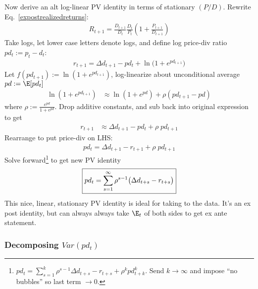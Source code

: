 \documentclass[12pt]{article}
\theoremstyle{plain}
\theoremstyle{definition}
\theoremstyle{remark}
\newcommand{\ra}{\rightarrow}
\begin{document}
\begin{multicols*}{2}
Now derive an alt log-linear PV identity in terms of
stationary $(P/D)$. Rewrite Eq.~\ref{expostrealizedreturns}:
\begin{align*}
  R_{t+1}
  =
  \frac{D_{t+1}}{D_t}
  \frac{D_{t}}{P_t}
  \left(
  1+
  \frac{P_{t+1}}{D_{t+1}}
  \right)
\end{align*}
Take logs, let lower case letters denote logs, and define log price-div
ratio $pd_t:=p_t-d_t$:
\begin{align*}
  r_{t+1}
  =
  \Delta d_{t+1} - pd_t + \ln\big( 1+ e^{pd_{t+1}} \big)
\end{align*}
Let $f(pd_{t+1}):=\ln(1+e^{pd_{t+1}})$, log-linearize
about unconditional average $pd:=\E[pd_t]$
\begin{align*}
  \ln(1+e^{pd_{t+1}})
  &\approx
  \ln(1+e^{pd})
  +
  \rho
  (pd_{t+1}-pd)
\end{align*}
where $\rho:=\frac{e^{pd}}{1+e^{pd}}$.
Drop additive constants, and sub back into original expression to get
\begin{align*}
  r_{t+1}
  &\approx \Delta d_{t+1} - pd_t + \rho \; pd_{t+1}
\end{align*}
Rearrange to put price-div on LHS:
\begin{align}
  pd_t
  =
    \Delta d_{t+1}- r_{t+1} + \rho \; pd_{t+1}
  \label{pdidentity}
\end{align}
Solve forward\footnote{%
  $pd_t = \sum_{s=1}^k \rho^{s-1}\Delta d_{t+s}-r_{t+s}+\rho^kpd_{t+k}^k$.
  Send $k\ra\infty$ and impose ``no bubbles'' so last term $\ra 0$.
}
to get new PV identity
\begin{align}
  \boxed{%
  pd_t
  =
  \sum_{s=1}^\infty
  \rho^{s-1}\big(\Delta d_{t+s}-r_{t+s}\big)
  }
  \label{pdidentityinf}
\end{align}
This nice, linear, stationary PV identity is ideal for taking to the
data. It's an ex post identity, but can always always take $\E_t$ of
both sides to get ex ante statement.


\subsubsection{Decomposing $Var(pd_t)$}
\label{sec:decompvar}


\end{multicols*}
\end{document}
